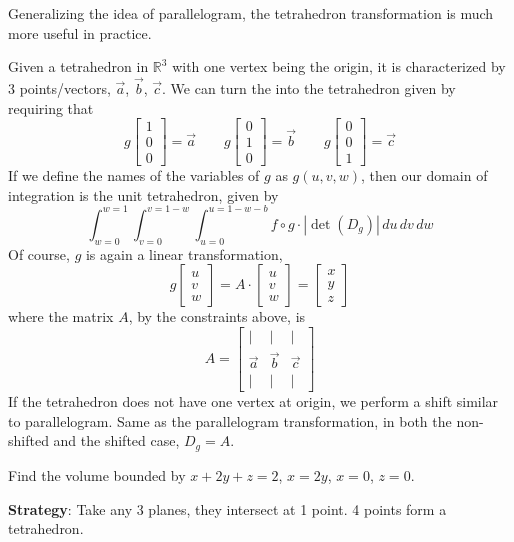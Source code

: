 Generalizing the idea of parallelogram, the tetrahedron transformation is much more useful in practice.

Given a tetrahedron in $\mathbb{R}^3$ with one vertex being the origin, it is characterized by 3 points/vectors, $\vec{a}$, $\vec{b}$, $\vec{c}$. We can turn the  into the tetrahedron given by requiring that $$ g\begin{bmatrix} 1 \\ 0 \\ 0 \end{bmatrix} = \vec{a} \qquad g \begin{bmatrix} 0 \\ 1 \\ 0 \end{bmatrix} = \vec{b} \qquad g \begin{bmatrix} 0 \\ 0 \\ 1 \end{bmatrix} = \vec{c}$$ If we define the names of the variables of $g$ as $g(u, v, w)$, then our domain of integration is the unit tetrahedron, given by $$\int_{w=0}^{w=1} \int_{v=0}^{v=1-w}\int_{u=0}^{u=1-w-b} f \circ g  \cdot |\det(D_g)| \,du \,dv \,dw$$ Of course, $g$ is again a linear transformation, $$g \begin{bmatrix} u \\ v \\ w \end{bmatrix} = A \cdot \begin{bmatrix} u \\ v \\ w \end{bmatrix} = \begin{bmatrix} x \\ y \\ z \end{bmatrix}$$ where the matrix $A$, by the constraints above, is $$A = \begin{bmatrix} | & | & | \\ \vec{a} & \vec{b} & \vec{c} \\ | & | & | \end{bmatrix}$$ If the tetrahedron does not have one vertex at origin, we perform a shift similar to parallelogram. Same as the parallelogram transformation, in both the non-shifted and the shifted case, $D_g = A$. 

\begin{exercise}
    Find the volume bounded by $x + 2y + z = 2$, $x = 2y$, $x = 0$, $z = 0$.

    \textbf{Strategy}: Take any 3 planes, they intersect at 1 point. 4 points form a tetrahedron. 
\end{exercise}

